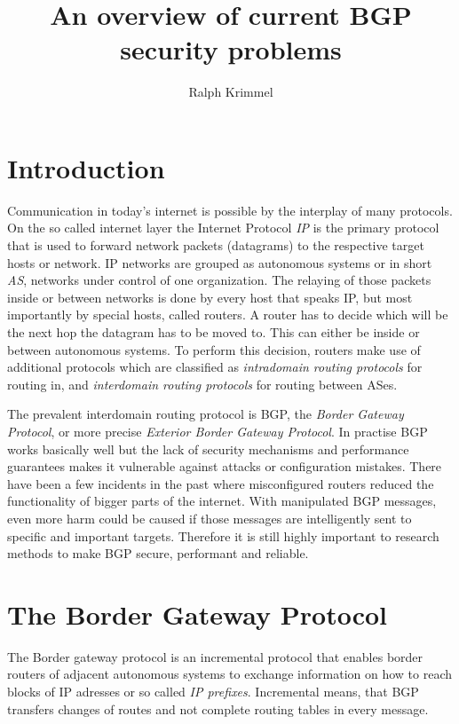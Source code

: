 \documentclass[12pt]{IEEEtran}
\author{Ralph Krimmel}
\title{An overview of current BGP security problems}
\begin{document}
	\maketitle
	\begin{abstract}
	\end{abstract}
	\section{Introduction}
	Communication in today's internet is possible by the interplay of many protocols. 
	On the so called internet layer the Internet Protocol \emph{IP} is the primary protocol that is used to forward network packets (datagrams) to the respective target hosts or network. 
	IP networks are grouped as autonomous systems or in short \emph{AS}, networks under control of one organization. 
	The relaying of those packets inside or between networks is done by every host that speaks IP, but most importantly by special hosts, called routers. 
	A router has to decide which will be the next hop the datagram has to be moved to. 
	This can either be inside or between autonomous systems. 
	To perform this decision, routers make use of additional protocols which are classified as \emph{intradomain routing protocols} for routing in, and \emph{interdomain routing protocols} for routing between ASes. 

	The prevalent interdomain routing protocol is BGP, the \emph{Border Gateway Protocol}, or more precise \emph{Exterior Border Gateway Protocol}. 
	In practise BGP works basically well but the lack of security mechanisms and performance guarantees makes it vulnerable against attacks or configuration mistakes. 
	There have been a few incidents in the past where misconfigured routers reduced the functionality of bigger parts of the internet. 
	With manipulated BGP messages, even more harm could be caused if those messages are intelligently sent to specific and important targets. 
	Therefore it is still highly important to research methods to make BGP secure, performant and reliable. 

	\section{The Border Gateway Protocol}
	The Border gateway protocol is an incremental protocol that enables border routers of adjacent autonomous systems to exchange information on how to reach blocks of IP adresses or so called \emph{IP prefixes}. 
	Incremental means, that BGP transfers changes of routes and not complete routing tables in every message.
\end{document}
